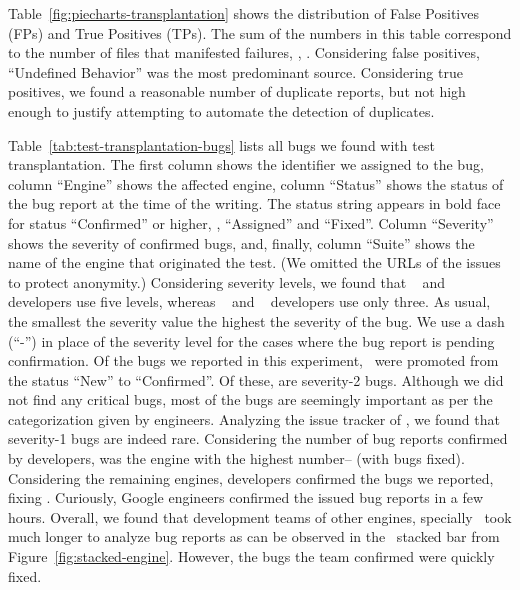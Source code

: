 \documentclass[smallextended]{svjour3}
\begin{document}
Table~\ref{fig:piecharts-transplantation} shows the distribution of
False Positives (FPs) and True Positives (TPs). The sum of the numbers
in this table correspond to the number of files that manifested
failures, \ie{}, \failuresTestTransDistictFiles{}. Considering false
positives, ``Undefined Behavior'' was the most predominant
source. Considering true positives, we found a reasonable number of
duplicate reports, but not high enough to justify attempting to
automate the detection of duplicates.




Table~\ref{tab:test-transplantation-bugs} lists all bugs we found with
test transplantation. The first column shows the identifier we
assigned to the bug, column ``Engine'' shows the
affected engine, column ``Status'' shows the status of the bug report
at the time of the writing. The status string appears in bold face for
status ``Confirmed'' or higher, \ie{}, ``Assigned'' and ``Fixed''.
Column ``Severity'' shows the severity of confirmed bugs, and,
finally, column ``Suite'' shows the name of the engine that originated
the test.  (We omitted the URLs of the issues to protect anonymity.)
Considering severity levels, we found that \jsc{}~\cite{jsc-severity}
and \smonkey{}~\cite{mozilla-severity} developers use five levels,
whereas \chakra{}~\cite{chakra-severity} and
\veight{}~\cite{v8-severity} developers use only three. As usual, the
smallest the severity value the highest the severity of the bug. We
use a dash (``-'') in place of the severity level for the cases where
the bug report is pending confirmation. Of the
\noBugsTransplantation{} bugs we reported in this experiment,
\noBugsTransplantationConfirmed\ were promoted from the status ``New''
to ``Confirmed''. Of these, \noBugsTransplantationSeverityTwo{} are severity-2 bugs.  Although we did
not find any critical bugs, most of the bugs are seemingly important
as per the categorization given by engineers. Analyzing the issue
tracker of \chakra, we found that severity-1 bugs are indeed
rare. Considering the number of bug reports confirmed by developers,
\chakra{} was the engine with the highest number--\bugsChakra{} (with \bugsChakraFixed{} bugs
fixed). Considering the remaining engines, \veight{} developers
confirmed the \noTransVeightBugsReported{} bugs we reported, fixing
\noTransVeightBugsFixed{}. Curiously, Google
engineers confirmed the issued bug reports in a few hours. Overall, we
found that development teams of other engines, specially \jsc\, took
much longer to analyze bug reports as can be observed in the
\jsc\ stacked bar from Figure~\ref{fig:stacked-engine}.
However, the bugs the \jsc{} team confirmed were quickly fixed.
\end{document}
